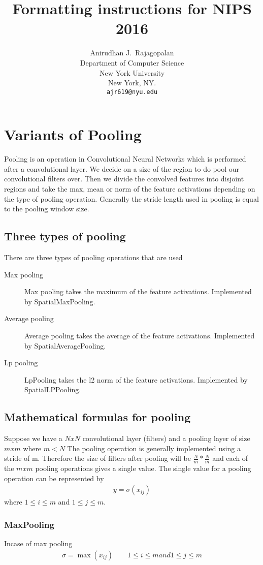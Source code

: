 \documentclass{article}
\title{Formatting instructions for NIPS 2016}
\author{Anirudhan J.~Rajagopalan \\
  Department of Computer Science\\
  New York University\\
  New York, NY.\\
  \texttt{ajr619@nyu.edu} \\
}
\begin{document}
\maketitle

\section{Variants of Pooling}
Pooling is an operation in Convolutional Neural Networks which is performed after a convolutional layer.  
We decide on a size of the region to do pool our convolutional filters over.
Then we divide the convolved features into disjoint regions and take the max, mean or norm of the feature activations depending on the type of pooling operation.
Generally the stride length used in pooling is equal to the pooling window size.
\subsection{Three types of pooling}
There are three types of pooling operations that are used
\begin{description}
  \item[Max pooling] Max pooling takes the maximum of the feature activations.  Implemented by \mbox{SpatialMaxPooling}.
  \item[Average pooling] Average pooling takes the average of the feature activations. Implemented by \mbox{SpatialAveragePooling}.
  \item[Lp pooling] LpPooling takes the l2 norm of the feature activations. Implemented by \mbox{SpatialLPPooling}.
\end{description}

\subsection{Mathematical formulas for pooling}
Suppose we have a $N x N$ convolutional layer (filters) and a pooling layer of size $m x m$ where $ m < N $
The pooling operation is generally implemented using a stride of m.
Therefore the size of filters after pooling will be $\frac{N}{m} * \frac{N}{m} $ and each of the $m x m$ pooling operations gives a single value.
The single value for a pooling operation can be represented by
\begin{align*}
  y = \sigma(x_{ij})
\end{align*}
where $1 \le i \le m $ and $1 \le j \le m $.
\subsubsection{MaxPooling}
Incase of max pooling
\begin{align*}
  \sigma = \max(x_{ij}) \qquad 1 \le i \le m and 1 \le j \le m
\end{align*}
\end{document}
